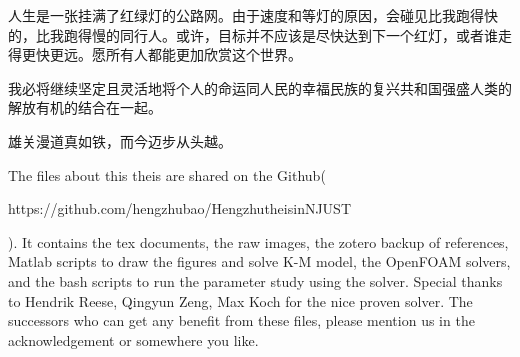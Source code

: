 \begin{thanks}
人生是一张挂满了红绿灯的公路网。由于速度和等灯的原因，会碰见比我跑得快的，比我跑得慢的同行人。或许，目标并不应该是尽快达到下一个红灯，或者谁走得更快更远。愿所有人都能更加欣赏这个世界。

我必将继续坚定且灵活地将个人的命运同人民的幸福民族的复兴共和国强盛人类的解放有机的结合在一起。

雄关漫道真如铁，而今迈步从头越。

The files about this theis are shared on the Github( 

https://github.com/hengzhubao/HengzhutheisinNJUST 

). It contains the tex documents, the raw images, the zotero backup of references, Matlab scripts to draw the figures and solve K-M model, the OpenFOAM solvers, and the bash scripts to run the parameter study using the solver. Special thanks to Hendrik Reese, Qingyun Zeng, Max Koch for the nice proven solver. The successors who can get any benefit from these files, please mention us in the acknowledgement or somewhere you like.


\end{thanks}